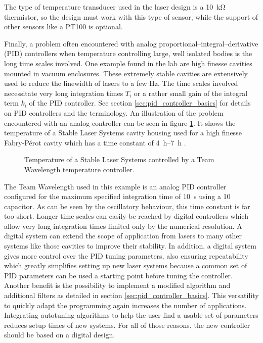 The type of temperature transducer used in the laser design is a \qty{10}{\kilo \ohm} thermistor, so the design must work with this type of sensor, while the support of other sensors like a PT100 is optional.

Finally, a problem often encountered with analog proportional–integral–derivative (PID) controllers when temperature controlling large, well isolated bodies is the long time scales involved. One example found in the lab are high finesse cavities mounted in vacuum enclosures. These extremely stable cavities are extensively used to reduce the linewidth of lasers to a few \unit{\Hz}. The time scales involved necessitate very long integration times $T_i$ or a rather small gain of the integral term $k_i$ of the PID controller. See section \ref{sec:pid_controller_basics} for details on PID controllers and the terminology. An illustration of the problem encountered with an analog controller can be seen in figure \ref{fig:stability_cavity}. It shows the temperature of a Stable Laser Systems  cavity housing used for a high finesse Fabry-Pérot cavity which has a time constant of \qtyrange[range-units = single, range-phrase={~to~}]{4}{7}{\hour} \cite{datasheet_vh6020}.
\begin{figure}[ht]
    \centering
    \caption{Temperature of a Stable Laser Systems  controlled by a Team Wavelength  temperature controller.}
    \label{fig:stability_cavity}
\end{figure}

The Team Wavelength  used in this example is an analog PID controller configured for the maximum specified integration time of \qty{10}{\s} using a \qty{10}{\uF} capacitor. As can be seen by the oscillatory behaviour, this time constant is far too short. Longer time scales can easily be reached by digital controllers which allow very long integration times limited only by the numerical resolution. A digital system can extend the scope of application from lasers to many other systems like those cavities to improve their stability. In addition, a digital system gives more control over the PID tuning parameters, also ensuring repeatability which greatly simplifies setting up new laser systems because a common set of PID parameters can be used a starting point before tuning the controller. Another benefit is the possibility to implement a modified algorithm and additional filters as detailed in section \ref{sec:pid_controller_basics}. This versatility to quickly adapt the programming again increases the number of applications. Integrating autotuning algorithms to help the user find a usable set of parameters reduces setup times of new systems. For all of those reasons, the new controller should be based on a digital design.

